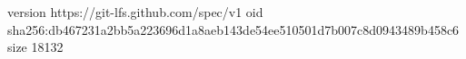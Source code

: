 version https://git-lfs.github.com/spec/v1
oid sha256:db467231a2bb5a223696d1a8aeb143de54ee510501d7b007c8d0943489b458c6
size 18132
